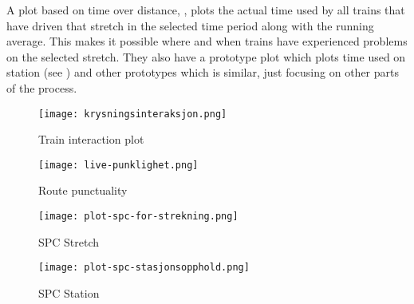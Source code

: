 A plot based on time over distance, , plots the
actual time used by all trains that have driven that stretch in the selected
time period along with the running average. This makes it possible where and
when trains have experienced problems on the selected stretch. They also have a
prototype plot which plots time used on station (see )
and other prototypes which is similar, just focusing on other parts of the
process.  %



\begin{figure}[!htbp]
	\texttt{[image: krysningsinteraksjon.png]}
	\caption[Train interaction plot]{Train interaction plot \cite{sintefPresis}}
	\label{fig:krysningsinteraksjon}
\end{figure}

\begin{figure}[!htbp]
	\texttt{[image: live-punklighet.png]}
	\caption[Route punctuality]{Route punctuality\cite{sintefPresis}}
	\label{fig:live-punklighet}
\end{figure}

\begin{figure}[!htbp]
	\texttt{[image: plot-spc-for-strekning.png]}
	\caption[SPC Stretch]{SPC Stretch \cite{sintefPresis}}
	\label{fig:plot-spc-for-strekning}
\end{figure}

\begin{figure}[!htbp]
	\texttt{[image: plot-spc-stasjonsopphold.png]}
	\caption[SPC Station]{SPC Station \cite{sintefPresis}}
	\label{fig:plot-spc-for-stasjonsopphold}
\end{figure}

